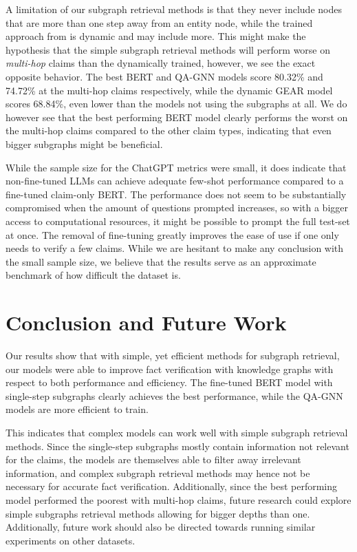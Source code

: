 \documentclass[11pt]{article}
\begin{document}
A limitation of our subgraph retrieval methods is that they never include nodes that are more than one step away from an entity node, while the trained approach from \citet{kim2023factkg} is dynamic and may include more. This might make the hypothesis that the simple subgraph retrieval methods will perform worse on \emph{multi-hop} claims than the dynamically trained, however, we see the exact opposite behavior. The best BERT and QA-GNN models score 80.32\% and 74.72\% at the multi-hop claims respectively, while the dynamic GEAR model scores 68.84\%, even lower than the models not using the subgraphs at all. We do however see that the best performing BERT model clearly performs the worst on the multi-hop claims compared to the other claim types, indicating that even bigger subgraphs might be beneficial.

While the sample size for the ChatGPT metrics were small, it does indicate that non-fine-tuned LLMs can achieve adequate few-shot performance compared to a fine-tuned claim-only BERT. The performance does not seem to be substantially compromised when the amount of questions prompted increases, so with a bigger access to computational resources, it might be possible to prompt the full test-set at once. The removal of fine-tuning greatly improves the ease of use if one only needs to verify a few claims. While we are hesitant to make any conclusion with the small sample size, we believe that the results serve as an approximate benchmark of how difficult the dataset is.

\section{Conclusion and Future Work}

Our results show that with simple, yet efficient methods for subgraph retrieval, our models were able to improve fact verification with knowledge graphs with respect to both performance and efficiency. The fine-tuned BERT model with single-step subgraphs clearly achieves the best performance, while the QA-GNN models are more efficient to train.

This indicates that complex models can work well with simple subgraph retrieval methods. Since the single-step subgraphs mostly contain information not relevant for the claims, the models are themselves able to filter away irrelevant information, and complex subgraph retrieval methods may hence not be necessary for accurate fact verification. Additionally, since the best performing model performed the poorest with multi-hop claims, future research could explore simple subgraphs retrieval methods allowing for bigger depths than one. Additionally, future work should also be directed towards running similar experiments on other datasets.
\end{document}
